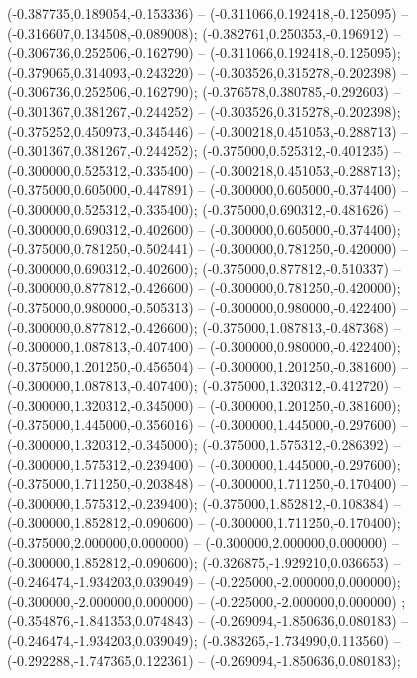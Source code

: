  (-0.387735,0.189054,-0.153336) -- (-0.311066,0.192418,-0.125095) -- (-0.316607,0.134508,-0.089008);
 (-0.382761,0.250353,-0.196912) -- (-0.306736,0.252506,-0.162790) -- (-0.311066,0.192418,-0.125095);
 (-0.379065,0.314093,-0.243220) -- (-0.303526,0.315278,-0.202398) -- (-0.306736,0.252506,-0.162790);
 (-0.376578,0.380785,-0.292603) -- (-0.301367,0.381267,-0.244252) -- (-0.303526,0.315278,-0.202398);
 (-0.375252,0.450973,-0.345446) -- (-0.300218,0.451053,-0.288713) -- (-0.301367,0.381267,-0.244252);
 (-0.375000,0.525312,-0.401235) -- (-0.300000,0.525312,-0.335400) -- (-0.300218,0.451053,-0.288713);
 (-0.375000,0.605000,-0.447891) -- (-0.300000,0.605000,-0.374400) -- (-0.300000,0.525312,-0.335400);
 (-0.375000,0.690312,-0.481626) -- (-0.300000,0.690312,-0.402600) -- (-0.300000,0.605000,-0.374400);
 (-0.375000,0.781250,-0.502441) -- (-0.300000,0.781250,-0.420000) -- (-0.300000,0.690312,-0.402600);
 (-0.375000,0.877812,-0.510337) -- (-0.300000,0.877812,-0.426600) -- (-0.300000,0.781250,-0.420000);
 (-0.375000,0.980000,-0.505313) -- (-0.300000,0.980000,-0.422400) -- (-0.300000,0.877812,-0.426600);
 (-0.375000,1.087813,-0.487368) -- (-0.300000,1.087813,-0.407400) -- (-0.300000,0.980000,-0.422400);
 (-0.375000,1.201250,-0.456504) -- (-0.300000,1.201250,-0.381600) -- (-0.300000,1.087813,-0.407400);
 (-0.375000,1.320312,-0.412720) -- (-0.300000,1.320312,-0.345000) -- (-0.300000,1.201250,-0.381600);
 (-0.375000,1.445000,-0.356016) -- (-0.300000,1.445000,-0.297600) -- (-0.300000,1.320312,-0.345000);
 (-0.375000,1.575312,-0.286392) -- (-0.300000,1.575312,-0.239400) -- (-0.300000,1.445000,-0.297600);
 (-0.375000,1.711250,-0.203848) -- (-0.300000,1.711250,-0.170400) -- (-0.300000,1.575312,-0.239400);
 (-0.375000,1.852812,-0.108384) -- (-0.300000,1.852812,-0.090600) -- (-0.300000,1.711250,-0.170400);
 (-0.375000,2.000000,0.000000) -- (-0.300000,2.000000,0.000000) -- (-0.300000,1.852812,-0.090600);
 (-0.326875,-1.929210,0.036653) -- (-0.246474,-1.934203,0.039049) -- (-0.225000,-2.000000,0.000000);
 (-0.300000,-2.000000,0.000000) -- (-0.225000,-2.000000,0.000000) ;
 (-0.354876,-1.841353,0.074843) -- (-0.269094,-1.850636,0.080183) -- (-0.246474,-1.934203,0.039049);
 (-0.383265,-1.734990,0.113560) -- (-0.292288,-1.747365,0.122361) -- (-0.269094,-1.850636,0.080183);
